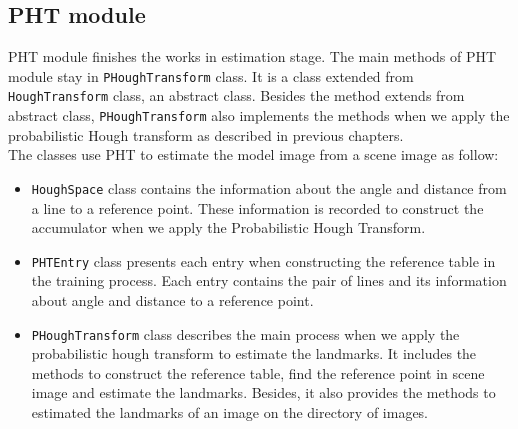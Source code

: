 \subsection{PHT module}
PHT module finishes the works in estimation stage. The main methods of PHT module stay in \texttt{PHoughTransform} class. It is a class extended from \texttt{HoughTransform} class, an abstract class. Besides the method extends from abstract class, \texttt{PHoughTransform} also implements the methods when we apply the probabilistic Hough transform as described in previous chapters.\\
The classes use PHT to estimate the model image from a scene image as follow:
\begin{itemize}
\item \texttt{HoughSpace} class contains the information about the angle and distance from a line to a reference point. These information is recorded to construct the accumulator when we apply the Probabilistic Hough Transform.
\item \texttt{PHTEntry} class presents each entry when constructing the reference table in the training process. Each entry contains the pair of lines and its information about angle and distance to a reference point.
\item \texttt{PHoughTransform} class describes the main process when we apply the probabilistic hough transform to estimate the landmarks. It includes the methods to construct the reference table, find the reference point in scene image and estimate the landmarks. Besides, it also provides the methods to estimated the landmarks of an image on the directory of images.
\end{itemize}
